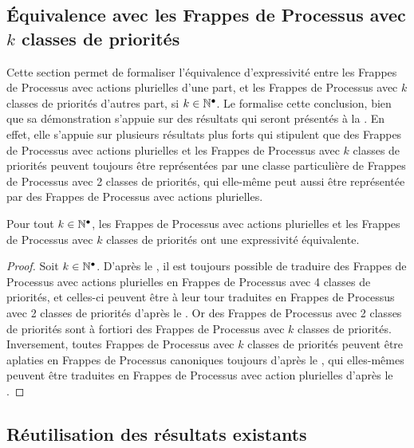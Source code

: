 \subsection{Équivalence avec les Frappes de Processus avec $k$ classes de priorités}

Cette section permet de formaliser l'équivalence d'expressivité entre les Frappes de Processus
avec actions plurielles d'une part, et les Frappes de Processus avec $k$ classes de priorités
d'autres part, si $k \in \mathbb{N}^\bullet$.
Le  formalise cette conclusion,
bien que sa démonstration s'appuie sur des résultats qui seront
présentés à la .
En effet, elle s'appuie sur plusieurs résultats plus forts qui stipulent que des
Frappes de Processus avec actions plurielles
et les Frappes de Processus avec $k$ classes de priorités
peuvent toujours être représentées
par une classe particulière de Frappes de Processus avec 2 classes de priorités,
qui elle-même peut aussi être représentée par des
Frappes de Processus avec actions plurielles.

\begin{theorem}[Équivalence]
  Pour tout $k \in \mathbb{N}^\bullet$,
  les Frappes de Processus avec actions plurielles
  et les Frappes de Processus avec $k$ classes de priorités
  ont une expressivité équivalente.
\end{theorem}

\begin{proof}
  Soit $k \in \mathbb{N}^\bullet$.
  D'après le , il est toujours possible de traduire
  des Frappes de Processus avec actions plurielles en Frappes de Processus
  avec 4 classes de priorités,
  et celles-ci peuvent être à leur tour traduites en
  Frappes de Processus avec 2 classes de priorités
  d'après le .
  Or des Frappes de Processus avec 2 classes de priorités sont
  à fortiori des Frappes de Processus avec $k$ classes de priorités.
  Inversement, toutes Frappes de Processus avec $k$ classes de priorités
  peuvent être aplaties en Frappes de Processus canoniques toujours
  d'après le ,
  qui elles-mêmes peuvent être traduites en Frappes de Processus avec action plurielles
  d'après le .
\end{proof}



\subsection{Réutilisation des résultats existants}

